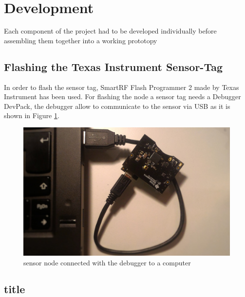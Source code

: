 \section{Development}

Each component of the project had to be developed individually before assembling them together into a working prototopy

\subsection{Flashing the Texas Instrument Sensor-Tag}
In order to flash the sensor tag, SmartRF Flash Programmer 2 made by Texas Instrument has been used. For flashing the node a sensor tag needs a Debugger DevPack, the debugger allow to communicate to the sensor via USB as it is shown in Figure \ref{fig:debug}.  
\begin{figure}[!h]
	\begin{center}
		\includegraphics[width=0.8\linewidth]{debugger}
		\caption{sensor node connected with the debugger to a computer}
		\label{fig:debug}
	\end{center}
	
\end{figure} 

\subsection{title}